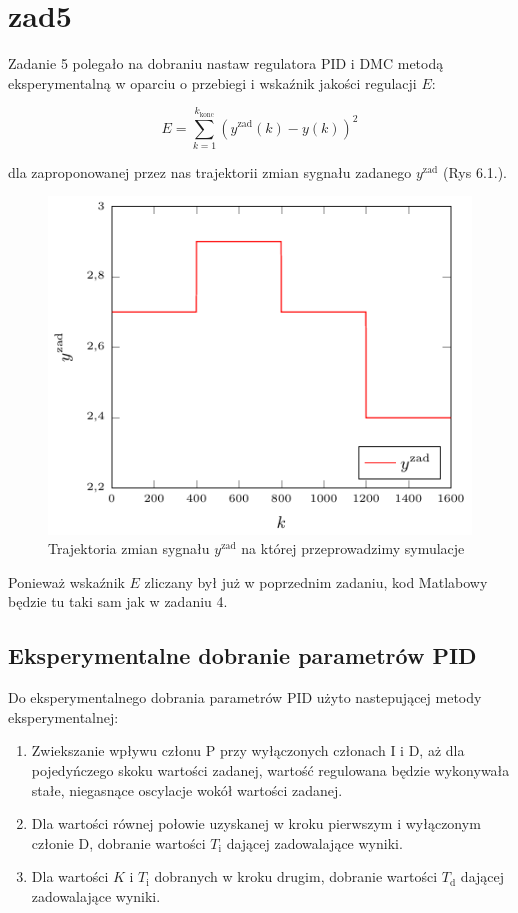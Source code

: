 \chapter{zad5}
Zadanie 5 polegało na dobraniu nastaw regulatora PID i DMC metodą eksperymentalną w oparciu o przebiegi i wskaźnik jakości regulacji $E$:

\begin{equation}
    E = \sum_{k=1}^{k_{\mathrm{konc}}}(y^{\mathrm{zad}}(k)-y(k))^{2}
\end{equation}

dla zaproponowanej przez nas trajektorii zmian sygnału zadanego $y^{\mathrm{zad}}$ (Rys 6.1.).

\begin{figure}[tb] 
\centering 
\includegraphics[scale=1]{rysunki/zapisz_pdf/y_zad.pdf} 
\caption{Trajektoria zmian sygnału $y^{\mathrm{zad}}$ na której przeprowadzimy symulacje} 
\label{r_pgfplots_trajektoria} 
\end{figure}

Ponieważ wskaźnik $E$ zliczany był już w poprzednim zadaniu, kod Matlabowy będzie tu taki sam jak w zadaniu 4.

\section{Eksperymentalne dobranie parametrów PID}
Do eksperymentalnego dobrania parametrów PID użyto nastepującej metody eksperymentalnej:
\begin{enumerate}
\item Zwiekszanie wpływu członu P przy wyłączonych członach I i D, aż dla pojedyńczego skoku wartości zadanej, wartość regulowana będzie wykonywała stałe, niegasnące oscylacje wokół wartości zadanej.
\item Dla wartości równej połowie uzyskanej w kroku pierwszym i wyłączonym członie D, dobranie wartości $T_{\mathrm{i}}$ dającej zadowalające wyniki.
\item Dla wartości $K$ i $T_{\mathrm{i}}$ dobranych w kroku drugim, dobranie wartości $T_{\mathrm{d}}$ dającej zadowalające wyniki.
\end{enumerate}



